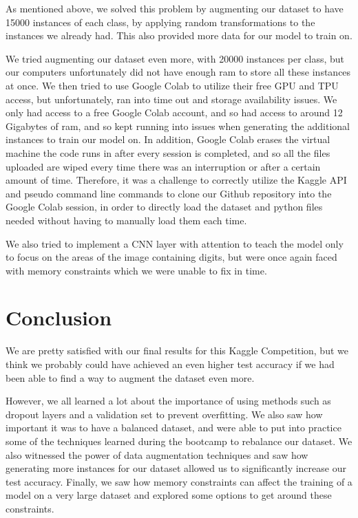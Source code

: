 \documentclass[11pt]{article}
\begin{document}
As mentioned above, we solved this problem by augmenting our dataset to
have 15000 instances of each class, by applying random transformations
to the instances we already had. This also provided more data for our
model to train on.

We tried augmenting our dataset even more, with 20000 instances per
class, but our computers unfortunately did not have enough ram to store
all these instances at once. We then tried to use Google Colab to
utilize their free GPU and TPU access, but unfortunately, ran into time
out and storage availability issues. We only had access to a free Google
Colab account, and so had access to around 12 Gigabytes of ram, and so
kept running into issues when generating the additional instances to
train our model on. In addition, Google Colab erases the virtual machine
the code runs in after every session is completed, and so all the files
uploaded are wiped every time there was an interruption or after a
certain amount of time. Therefore, it was a challenge to correctly
utilize the Kaggle API and pseudo command line commands to clone our
Github repository into the Google Colab session, in order to directly
load the dataset and python files needed without having to manually load
them each time.

We also tried to implement a CNN layer with attention to teach the model
only to focus on the areas of the image containing digits, but were once
again faced with memory constraints which we were unable to fix in time.

\section{Conclusion}
We are pretty satisfied with our final results for this Kaggle
Competition, but we think we probably could have achieved an even higher
test accuracy if we had been able to find a way to augment the dataset
even more. 

However, we all learned a lot about the importance of using methods such
as dropout layers and a validation set to prevent overfitting. We also
saw how important it was to have a balanced dataset, and were able to
put into practice some of the techniques learned during the bootcamp to
rebalance our dataset. We also witnessed the power of data augmentation
techniques and saw how generating more instances for our dataset allowed
us to significantly increase our test accuracy.  Finally, we saw how
memory constraints can affect the training of a model on a very large
dataset and explored some options to get around these constraints.
\end{document}
